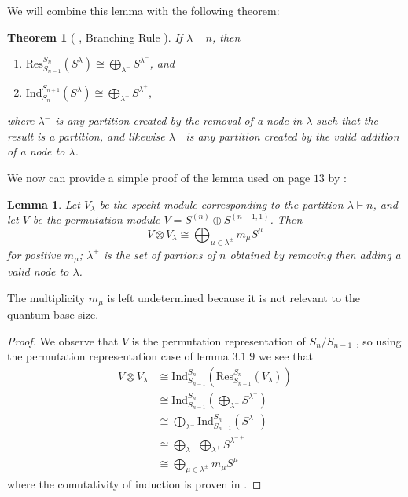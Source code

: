 \documentclass[12pt,twoside]{reedthesis}
\theoremstyle{plain}   %
\newtheorem{thm}{Theorem}[section] %
\newtheorem{lemma}{Lemma}[section]
\theoremstyle{definition}
\theoremstyle{remark}
\numberwithin{equation}{section}
\def\ind{\mathrm{Ind}}
\def\res{\mathrm{Res}}
\begin{document}
  We will combine this lemma with the following theorem:
  \begin{thm}[{ \cite[2.8.3]{sagan}, Branching Rule }]
    If $\lambda \vdash n$, then
    \begin{enumerate}
    \item $\res^{S_{n}}_{S_{n-1}} (S^\lambda) \cong \bigoplus_{\lambda^-} S^{\lambda^-}$, and
    \item $\ind^{S_{n+1}}_{S_{n}} (S^\lambda) \cong \bigoplus_{\lambda^+} S^{\lambda^+},$
    \end{enumerate}
    where $\lambda^-$ is any partition created by the removal of a node in $\lambda$ such that the result is a partition,
    and likewise $\lambda^+$ is any partition created by the valid addition of a node to $\lambda$.
  \end{thm}
  We now can provide a simple proof of the lemma used on page $13$ by \cite{copeland}:
  \begin{lemma}
    Let $V_\lambda$ be the specht module corresponding to the partition $\lambda \vdash n$, and let $V$ be the permutation module $V = S^{(n)} \oplus S^{(n-1,1)}$.
    Then
    \[V \otimes V_\lambda \cong \bigoplus_ {\mu \in \lambda^\pm} m_\mu S^\mu \]
    for positive $m_\mu$; $\lambda^\pm$ is the set of partions of $n$ obtained by removing then adding a valid node to $\lambda$.
  \end{lemma}
  The multiplicity $m_\mu$ is left undetermined because it is not relevant to the quantum base size.
  \begin{proof}
    We observe that $V$ is the permutation representation of $S_n / S_{n-1}$ , so using the permutation representation case of lemma $3.1.9$  we see that
    \begin{align*}
      V \otimes V_\lambda &\cong \ind^{S_{n}}_{S_{n-1}} ( \res^{S_{n}}_{S_{n-1}} (V_\lambda))\\
                          &\cong \ind^{S_{n}}_{S_{n-1}} (\bigoplus_{\lambda^-} S^{\lambda^-})\\
                          &\cong \bigoplus_{\lambda^-} \ind^{S_{n}}_{S_{n-1}} ( S^{\lambda^-}) \\
                          &\cong \bigoplus_{\lambda^-} \bigoplus_{\lambda^+} S^{\lambda^{-+}} \\
                          &\cong \bigoplus_ {\mu \in \lambda^\pm} m_\mu S^\mu
    \end{align*}
    where the comutativity of induction is proven in \cite[Excercise 3.15]{fulton2004}.
  \end{proof}
\end{document}
